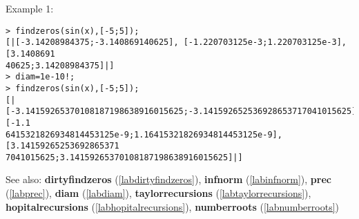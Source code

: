 \noindent Example 1: 
\begin{center}\begin{minipage}{15cm}\begin{Verbatim}[frame=single]
> findzeros(sin(x),[-5;5]);
[|[-3.14208984375;-3.140869140625], [-1.220703125e-3;1.220703125e-3], [3.1408691
40625;3.14208984375]|]
> diam=1e-10!;
> findzeros(sin(x),[-5;5]);
[|[-3.14159265370108187198638916015625;-3.141592652536928653717041015625], [-1.1
6415321826934814453125e-9;1.16415321826934814453125e-9], [3.14159265253692865371
7041015625;3.14159265370108187198638916015625]|]
\end{Verbatim}
\end{minipage}\end{center}
See also: \textbf{dirtyfindzeros} (\ref{labdirtyfindzeros}), \textbf{infnorm} (\ref{labinfnorm}), \textbf{prec} (\ref{labprec}), \textbf{diam} (\ref{labdiam}), \textbf{taylorrecursions} (\ref{labtaylorrecursions}), \textbf{hopitalrecursions} (\ref{labhopitalrecursions}), \textbf{numberroots} (\ref{labnumberroots})
